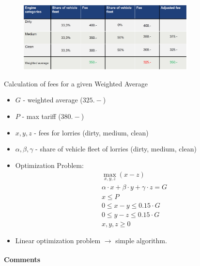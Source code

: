 \begin{figure}[H]
    \centering
    \includegraphics[width=0.8\textwidth]{Pictures/Land_transport_treaty.png}
\end{figure}

Calculation of fees for a given Weighted Average

\begin{itemize}
    \item $G$ - weighted average ($325.-$)
    \item $P$ - max tariff ($380.-$)
    \item $x,y,z$ - fees for lorries (dirty, medium, clean)
    \item $\alpha, \beta, \gamma$ - share of vehicle fleet of lorries (dirty, medium, clean)
    \item Optimization Problem:
        \begin{align*}
            &\max_{x,y,z} (x-z)
            \\
            &\alpha \cdot x + \beta \cdot y + \gamma \cdot z = G
            \\
            &x \leq P
            \\
            &0 \leq x - y \leq 0.15 \cdot G
            \\
            &0 \leq y - z \leq 0.15 \cdot G
            \\
            &x,y,z \geq 0
        \end{align*}
    \item Linear optimization problem $\rightarrow$ simple algorithm.
\end{itemize}

\paragraph{Comments}

